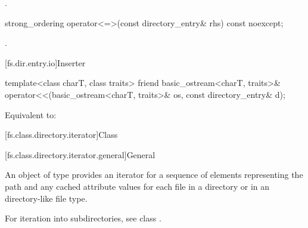 \begin{itemdescr}
\pnum
\returns
{}.
\end{itemdescr}

%
\begin{itemdecl}
strong_ordering operator<=>(const directory_entry& rhs) const noexcept;
\end{itemdecl}

\begin{itemdescr}
\pnum
\returns
{}.
\end{itemdescr}

[fs.dir.entry.io]{Inserter}

%
\begin{itemdecl}
template<class charT, class traits>
  friend basic_ostream<charT, traits>&
    operator<<(basic_ostream<charT, traits>& os, const directory_entry& d);
\end{itemdecl}

\begin{itemdescr}
\pnum
\effects
Equivalent to: 
\end{itemdescr}

[fs.class.directory.iterator]{Class }

[fs.class.directory.iterator.general]{General}

%
\pnum
An object of type  provides an iterator for a
sequence of  elements representing the
path and any cached attribute values
for each file in a directory
or in an  directory-like file type.
\begin{note}
For iteration into subdirectories, see class .
\end{note}

